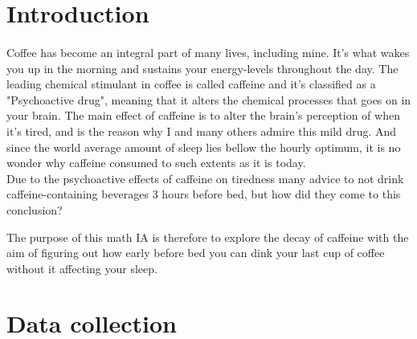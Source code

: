 \documentclass[12pt]{article}
\begin{document}
            \tableofcontents
            \thispagestyle{empty}
            \addtocounter{page}{-1}
            



            \newpage
            \section{Introduction} %
            \paragraph{}
                Coffee has become an integral part of many lives, including mine. It's what wakes you up in the morning and sustains your energy-levels throughout the day. The leading chemical stimulant in coffee is called caffeine and it's classified as a "Psychoactive drug", meaning that it alters the chemical processes that goes on in your brain. The main effect of caffeine is to alter the brain's perception of when it's tired, and is the reason why I and many others admire this mild drug. And since the world average amount of sleep lies bellow the hourly optimum, it is no wonder why caffeine consumed to such extents as it is today.
                \\
                Due to the psychoactive effects of caffeine on tiredness many advice to not drink caffeine-containing beverages 3 hours before bed, but how did they come to this conclusion?
                


                \noindent The purpose of this math IA is therefore to explore the decay of caffeine with the aim of figuring out how early before bed you can dink your last cup of coffee without it affecting your sleep.



        \section{Data collection}
\end{document}
